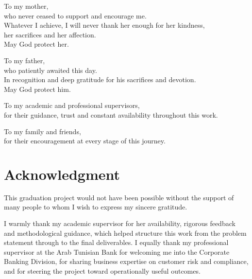 \documentclass[a4paper, oneside, 12pt, final]{extreport}
\begin{document}
\begin{flushright}
\begin{minipage}{0.9\textwidth}
\itshape

To my mother,\\
who never ceased to support and encourage me.\\
Whatever I achieve, I will never thank her enough for her kindness,\\
her sacrifices and her affection.\\
May God protect her.

\vspace{0.5cm}

To my father,\\
who patiently awaited this day.\\
In recognition and deep gratitude for his sacrifices and devotion.\\
May God protect him.

\vspace{0.5cm}

To my academic and professional supervisors,\\
for their guidance, trust and constant availability throughout this work.

\vspace{0.5cm}

To my family and friends,\\
for their encouragement at every stage of this journey.

\end{minipage}
\end{flushright}

\chapter*{Acknowledgment}
\thispagestyle{empty}

This graduation project would not have been possible without the support of many people
to whom I wish to express my sincere gratitude.

I warmly thank my academic supervisor for her availability, rigorous feedback and
methodological guidance, which helped structure this work from the problem statement
through to the final deliverables. I equally thank my professional supervisor at the
Arab Tunisian Bank for welcoming me into the Corporate Banking Division, for sharing
business expertise on customer risk and compliance, and for steering the project toward
operationally useful outcomes.
\end{document}
